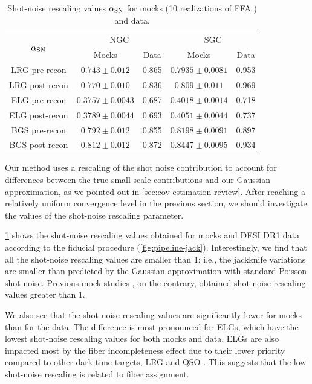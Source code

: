 \begin{table}[tb]
    \centering
    \begin{tabular}{|c|c|c|c|c|}
\hline
\multirow{2}{*}{$\alpha_{\rm SN}$} & \multicolumn{2}{|c|}{NGC} & \multicolumn{2}{|c|}{SGC} \\
\cline{2-5}
 & Mocks & Data & Mocks & Data \\
\hline
LRG pre-recon & $0.743 \pm 0.012$ & 0.865 & $0.7935 \pm 0.0081$ & 0.953 \\
\hline
LRG post-recon & $0.770 \pm 0.010$ & 0.836 & $0.809 \pm 0.011$ & 0.969 \\
\hline
ELG pre-recon & $0.3757 \pm 0.0043$ & 0.687 & $0.4018 \pm 0.0014$ & 0.718 \\
\hline
ELG post-recon & $0.3789 \pm 0.0044$ & 0.693 & $0.4051 \pm 0.0044$ & 0.737 \\
\hline
BGS pre-recon & $0.792 \pm 0.012$ & 0.855 & $0.8198 \pm 0.0091$ & 0.897 \\
\hline
BGS post-recon & $0.812 \pm 0.012$ & 0.872 & $0.8447 \pm 0.0095$ & 0.934 \\
\hline
    \end{tabular}
    \caption[Shot-noise rescaling values for \desimock{} (one type) and data.]{Shot-noise rescaling values $\alpha_{\rm SN}$ for mocks (10 realizations of FFA \ezmocks{}) and data. %
    }
    \label{tab:shot-noise-rescaling}
\end{table}

Our method uses a rescaling of the shot noise contribution to account for differences between the true small-scale contributions and our Gaussian approximation, as we pointed out in \cref{sec:cov-estimation-review}.
After reaching a relatively uniform convergence level in the previous section, we should investigate the values of the shot-noise rescaling parameter.

\cref{tab:shot-noise-rescaling} shows the shot-noise rescaling values obtained for mocks and DESI DR1 data according to the fiducial procedure (\cref{fig:pipeline-jack}).
Interestingly, we find that all the shot-noise rescaling values are smaller than 1;
i.e., the jackknife variations are smaller than predicted by the Gaussian approximation with standard Poisson shot noise.
Previous mock studies \citep[our \cref{subsec:shot-noise-rescaling}]{rascal,rascal-jackknife,rascalC}, on the contrary, obtained shot-noise rescaling values greater than 1.

We also see that the shot-noise rescaling values are significantly lower for mocks than for the data.
The difference is most pronounced for ELGs, which have the lowest shot-noise rescaling values for both mocks and data.
ELGs are also impacted most by the fiber incompleteness effect due to their lower priority compared to other dark-time targets, LRG and QSO \cite{ELG.TS.Raichoor.2023}.
This suggests that the low shot-noise rescaling is related to fiber assignment.

